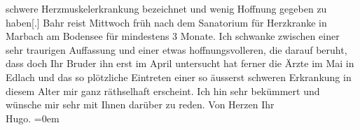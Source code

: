 \begin{ledgroupsized}[t]{13cm}
                    schwere Herzmuskelerkrankung {\pb}bezeichnet und wenig Hoffnung gegeben zu haben{[}.{]}\pend
           \pstart
           Bahr reist Mittwoch früh nach dem Sanatorium für Herzkranke in Marbach am
                        Bodensee für mindestens 3 Monate. Ich schwanke zwischen einer sehr
                    traurigen Auffassung und einer etwas hoffnungsvolleren, die darauf beruht, dass
                    doch Ihr Bruder ihn {\pb}erst im April
                    untersucht hat ferner die Ärzte im Mai in Edlach und das so plötzliche Eintreten einer so äusserst
                    schweren Erkrankung in diesem Alter mir ganz räthselhaft erscheint.\pend
           \pstart
           Ich hin sehr bekümmert und wünsche mir sehr mit Ihnen darüber zu reden. Von
                    Herzen Ihr{\\[\baselineskip]}\spacefill\mbox{Hugo.}\pend
           \leftskip=0em{}          \endnumbering{}\end{ledgroupsized}  \newcommand{\dateiname}{L01361}\newcommand{\titel}{Hugo von Hofmannsthal an Arthur Schnitzler, [8.–9. 1. 1904]}\newcommand{\editorInnen}{ Martin Anton Müller und Gerd-Hermann Susen}
      